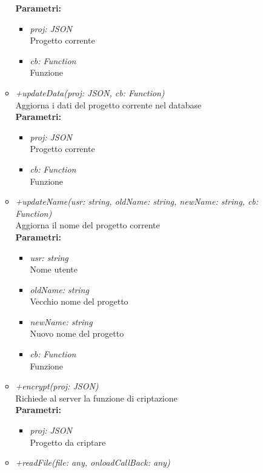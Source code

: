 \begin{itemize}
\begin{itemize}
    		\textbf{Parametri:}
    		\begin{itemize}
    			\item \emph{proj: JSON}\\
    			Progetto corrente
    			\item \emph{cb: Function}\\
    			Funzione
    		\end{itemize}
    		\item \emph{+updateData(proj: JSON, cb: Function)}\\
    		Aggiorna i dati del progetto corrente nel database\\
    		\textbf{Parametri:}
    		\begin{itemize}
    			\item \emph{proj: JSON}\\
    			Progetto corrente
    			\item \emph{cb: Function}\\
    			Funzione
    		\end{itemize}
    		\item \emph{+updateName(usr: string, oldName: string, newName: string, cb: Function)}\\
    		Aggiorna il nome del progetto corrente\\
    		\textbf{Parametri:}
    		\begin{itemize}
    			\item \emph{usr: string}\\
    			Nome utente
    			\item \emph{oldName: string}\\
    			Vecchio nome del progetto
    			\item \emph{newName: string}\\
    			Nuovo nome del progetto
    			\item \emph{cb: Function}\\
    			Funzione
    		\end{itemize}
    		\item \emph{+encrypt(proj: JSON)}\\
    		Richiede al server la funzione di criptazione\\
    		\textbf{Parametri:}
    		\begin{itemize}
    			\item \emph{proj: JSON}\\
    			Progetto da criptare
    		\end{itemize}
    		\item \emph{+readFile(file: any, onloadCallBack: any)}\\

\end{itemize}
\end{itemize}
